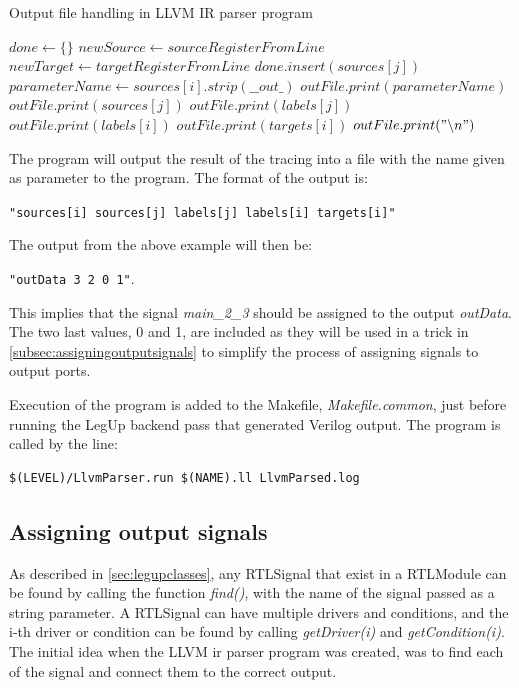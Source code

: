 \begin{algorithm}
  \caption{Output file handling in LLVM IR parser program
  \label{alg:llvmparserpart2}}
  \begin{algorithmic}[1]
    \State $done \leftarrow \{\}$
            \State $newSource \leftarrow sourceRegisterFromLine$
            \State $newTarget \leftarrow targetRegisterFromLine$
            \State $done.insert(sources[j])$
              \State $parameterName \leftarrow sources[i].strip(\_\_out\_)$
              \State $outFile.print(parameterName)$
              \State $outFile.print(sources[j])$
              \State $outFile.print(labels[j])$
              \State $outFile.print(labels[i])$
              \State $outFile.print(targets[i])$
              \State $outFile.print("\backslash n")$ 
            \EndIf
          \EndIf
        \EndFor
      \EndFor
    \EndIf
  \end{algorithmic}
\end{algorithm}

The program will output the result of the tracing into a file with the name given as parameter to the program. The format of the output is:

\verb!"sources[i] sources[j] labels[j] labels[i] targets[i]"!

The output from the above example will then be:

\verb!"outData 3 2 0 1"!.

This implies that the signal \textit{main\_2\_3} should be assigned to the output \textit{outData}. The two last values, 0 and 1, are included as they will be used in a trick in \cref{subsec:assigningoutputsignals} to simplify the process of assigning signals to output ports.

Execution of the program is added to the Makefile, \textit{Makefile.common}, just before running the LegUp backend pass that generated Verilog output. The program is called by the line:
\begin{verbatim}
$(LEVEL)/LlvmParser.run $(NAME).ll LlvmParsed.log
\end{verbatim}

\subsection{\label{subsec:assigningoutputsignals}Assigning output signals}
As described in \cref{sec:legupclasses}, any RTLSignal that exist in a RTLModule can be found by calling the function \textit{find()}, with the name of the signal passed as a string parameter. A RTLSignal can have multiple drivers and conditions, and the i-th driver or condition can be found by calling \textit{getDriver(i)} and \textit{getCondition(i)}. The initial idea when the LLVM \gls{ir} parser program was created, was to find each of the signal and connect them to the correct output.

